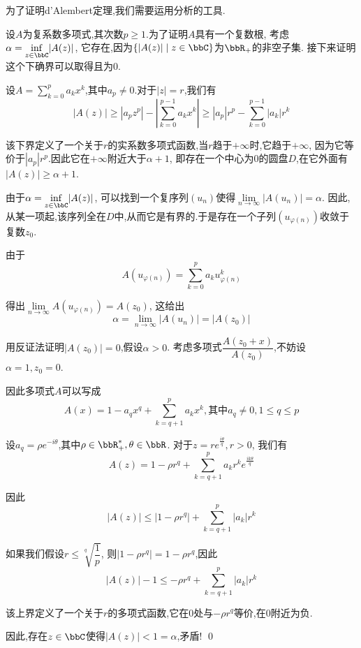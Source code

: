 为了证明d'Alembert定理,我们需要运用分析的工具.

设$A$为复系数多项式,其次数$p \geqslant 1$.为了证明$A$具有一个复数根,
考虑$\alpha = \inf\limits_{z \in \bbC} \lvert A(z) \rvert$,
它存在,因为$\{ \lvert A(z) \rvert \mid z \in \bbC \}$为$\bbR_+$的非空子集.
接下来证明这个下确界可以取得且为0.

设$A = \sum\limits_{k = 0}^p a_k x^k$,其中$a_p \neq 0$.对于$\lvert z \rvert  = r$,我们有
$$\lvert A(z) \rvert \geqslant \left\lvert a_p z^p \right\rvert - \left\lvert
\sum\limits_{k = 0}^{p - 1} a_k x^k \right\rvert \geqslant \left\lvert a_p \right\rvert r^p -
\sum\limits_{k = 0}^{p - 1} \left\lvert a_k \right\rvert r^k$$

该下界定义了一个关于$r$的实系数多项式函数,当$r$趋于$+ \infty$时,它趋于$+ \infty$,
因为它等价于$\left\lvert a_p \right\rvert r^p$.因此它在$+ \infty$附近大于$\alpha + 1$,
即存在一个中心为0的圆盘$D$,在它外面有$\lvert A(z) \rvert \geqslant \alpha+1$.

由于$\alpha = \inf\limits_{z \in \bbC} \lvert A(z) \rvert$,
可以找到一个复序列$(u_n)$使得$\lim\limits_{n \to \infty} \lvert A(u_n) \rvert = \alpha$.
因此,从某一项起,该序列全在$D$中,从而它是有界的.于是存在一个子列$(u_{\varphi(n)})$收敛于复数$z_0$.

由于\[ A(u_{\varphi(n)}) = \sum\limits_{k = 0}^p a_k u_{\varphi(n)}^k \]

得出$\lim\limits_{n \to \infty} A(u_{\varphi(n)}) = A(z_0)$,
这给出\[ \alpha = \lim\limits_{n \to \infty} \lvert A(u_n) \rvert = \lvert A(z_0) \rvert \]

用反证法证明$\lvert A(z_0) \rvert = 0$,假设$\alpha > 0$.
考虑多项式$\dfrac{A(z_0 + x)}{A(z_0)}$,不妨设$\alpha = 1, z_0 = 0$.

因此多项式$A$可以写成$$A(x) = 1 - a_q x^q + \sum_{k = q + 1}^p a_k x^k,
\text{其中} a_q \neq 0, 1 \leqslant q \leqslant p$$

设$a_q = \rho e^{- i \theta}$,其中$\rho \in \bbR_+^*, \theta \in \bbR$.
对于$z = r e^{\frac{i \theta}{q}}, r > 0$,
我们有\[ A(z) = 1 - \rho r^q + \sum\limits_{k = q + 1}^p a_k r^k e^{\frac{ik \theta}{q}} \]

因此$$\lvert A(z) \rvert \leqslant \left\lvert 1 - \rho r^q \right\rvert +
\sum\limits_{k = q + 1}^p \left\lvert a_k \right\rvert r^k$$

如果我们假设$r \leqslant \sqrt[q]{\dfrac{1}{p}}$,
则$\left\lvert 1 - \rho r^q \right\rvert = 1 - \rho r^q$,因此
\[ \lvert A(z) \rvert - 1 \leqslant - \rho r^q + \sum\limits_{k = q + 1}^p \lvert a_k \rvert r^k \]

该上界定义了一个关于$r$的多项式函数,它在0处与$- \rho r^q$等价,在0附近为负.

因此,存在$z \in \bbC$使得$\lvert A(z) \rvert < 1 = \alpha$,矛盾! \qed